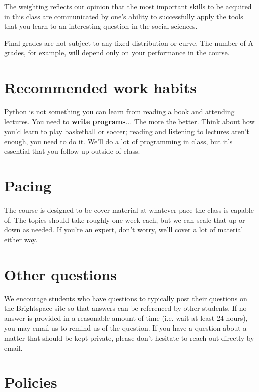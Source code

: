 \documentclass[12pt,pdftex,twoside,letterpaper]{exam}
\begin{document}
    The weighting reflects our opinion that the most important skills to be acquired in this class
    are communicated by one's ability to successfully apply the tools that you learn to an
    interesting question in the social sciences.

    Final grades are not subject to any fixed distribution or curve. The number of A grades, for
    example, will depend only on your performance in the course.

\section*{Recommended work habits}

  Python is not something you can learn from reading a book and attending lectures. You need to
  {\bf write programs}... The more the better. Think about how you'd learn to play basketball
  or soccer; reading and listening to lectures aren't enough, you need to do it. We'll do a lot of
  programming in class, but it's {essential} that you follow up outside of class.

\section*{Pacing}

  The course is designed to be cover material at whatever pace the class is capable of. The topics
  should take roughly one week each, but we can scale that up or down as needed. If you're an expert,
  don't worry, we'll cover a lot of material either way.

\section*{Other questions}

  We encourage students who have questions to typically post their questions on the Brightspace
  site so that answers can be referenced by other students. If no answer is provided in a reasonable
  amount of time (i.e. wait at least 24 hours), you may email us to remind us of the question. If you
  have a question about a matter that should be kept private, please don't hesitate to reach out
  directly by email.


\section*{Policies}
\end{document}

